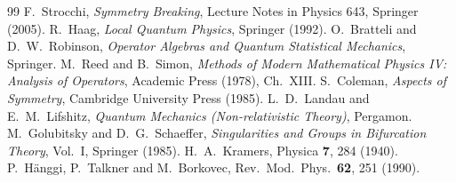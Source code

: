 \documentclass[11pt,a4paper]{article}
\theoremstyle{definition}
\theoremstyle{remark}
\begin{document}
\begin{thebibliography}{99}
 F.~Strocchi, \emph{Symmetry Breaking}, Lecture Notes in Physics 643, Springer (2005).
 R.~Haag, \emph{Local Quantum Physics}, Springer (1992).
 O.~Bratteli and D.~W.~Robinson, \emph{Operator Algebras and Quantum Statistical Mechanics}, Springer.
 M.~Reed and B.~Simon, \emph{Methods of Modern Mathematical Physics IV: Analysis of Operators}, Academic Press (1978), Ch.~XIII.
 S.~Coleman, \emph{Aspects of Symmetry}, Cambridge University Press (1985).
 L.~D.~Landau and E.~M.~Lifshitz, \emph{Quantum Mechanics (Non-relativistic Theory)}, Pergamon.
 M.~Golubitsky and D.~G.~Schaeffer, \emph{Singularities and Groups in Bifurcation Theory}, Vol.~I, Springer (1985).
 H.~A.~Kramers, Physica \textbf{7}, 284 (1940).
 P.~H\"anggi, P.~Talkner and M.~Borkovec, Rev.\ Mod.\ Phys.\ \textbf{62}, 251 (1990).
\end{thebibliography}
\end{document}
